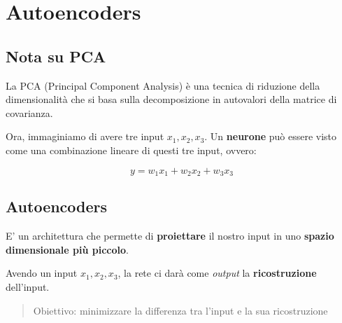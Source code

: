 \section{Autoencoders}

\subsection{Nota su PCA}

La PCA (Principal Component Analysis) è una tecnica di riduzione della
dimensionalità che si basa sulla decomposizione in autovalori della matrice di
covarianza.

Ora, immaginiamo di avere tre input $x_1, x_2, x_3$. Un \textbf{neurone} può
essere visto come una combinazione lineare di questi tre input, ovvero:

\begin{equation}
    y = w_1x_1 + w_2x_2 + w_3x_3
\end{equation}

\subsection{Autoencoders}

E' un architettura che permette di \textbf{proiettare} il nostro input in uno
\textbf{spazio dimensionale più piccolo}.

Avendo un input $x_1, x_2, x_3$, la rete ci darà come \textit{output} la
\textbf{ricostruzione} dell'input.

\begin{quote}
    Obiettivo: minimizzare la differenza tra l'input e la sua ricostruzione
\end{quote}


